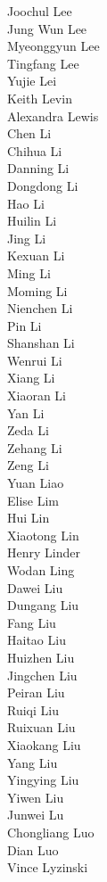 Joochul Lee\\
Jung Wun Lee\\
Myeonggyun Lee\\
Tingfang Lee\\
Yujie Lei\\
Keith Levin\\
Alexandra Lewis\\
Chen Li\\
Chihua Li\\
Danning Li\\
Dongdong Li\\
Hao Li\\
Huilin Li\\
Jing Li\\
Kexuan Li\\
Ming Li\\
Moming Li\\
Nienchen Li\\
Pin Li\\
Shanshan Li\\
Wenrui Li\\
Xiang Li\\
Xiaoran Li\\
Yan Li\\
Zeda Li\\
Zehang Li\\
Zeng Li\\
Yuan Liao\\
Elise Lim\\
Hui Lin\\
Xiaotong Lin\\
Henry Linder\\
Wodan Ling\\
Dawei Liu\\
Dungang Liu\\
Fang Liu\\
Haitao Liu\\
Huizhen Liu\\
Jingchen Liu\\
Peiran Liu\\
Ruiqi Liu\\
Ruixuan Liu\\
Xiaokang Liu\\
Yang Liu\\
Yingying Liu\\
Yiwen Liu\\
Junwei Lu\\
Chongliang Luo\\
Dian Luo\\
Vince Lyzinski\\
